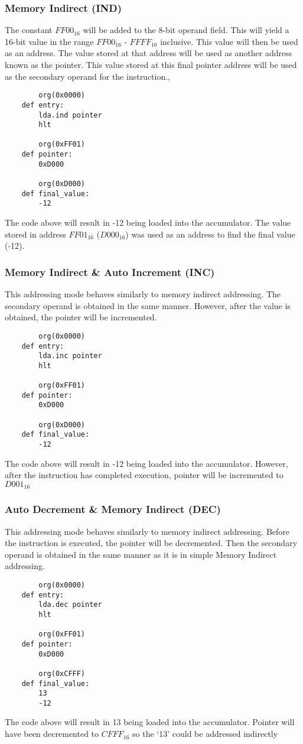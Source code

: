 \subsubsection{Memory Indirect (IND)}
The constant $FF00_{16}$ will be added to the 8-bit operand field.
This will yield a 16-bit value in the range $FF00_{16}$ - $FFFF_{16}$ inclusive.
This value will then be used as an address.
The value stored at that address will be used as another address known as the pointer.
This value stored at this final pointer address will be used as the secondary operand for the instruction.,
\begin{verbatim}
        org(0x0000)
    def entry:
        lda.ind pointer
        hlt

        org(0xFF01)
    def pointer:
        0xD000

        org(0xD000)
    def final_value:
        -12
\end{verbatim}
The code above will result in -12 being loaded into the accumulator.
The value stored in address $FF01_{16}$ ($D000_{16}$) was used as an address to find the final value (-12).

\subsubsection{Memory Indirect \& Auto Increment (INC)}
This addressing mode behaves similarly to memory indirect addressing.
The secondary operand is obtained in the same manner.
However, after the value is obtained, the pointer will be incremented.
\begin{verbatim}
        org(0x0000)
    def entry:
        lda.inc pointer
        hlt

        org(0xFF01)
    def pointer:
        0xD000

        org(0xD000)
    def final_value:
        -12
\end{verbatim}
The code above will result in -12 being loaded into the accumulator.
However, after the instruction has completed execution, pointer will be incremented to $D001_{16}$

\subsubsection{Auto Decrement \& Memory Indirect (DEC)}
This addressing mode behaves similarly to memory indirect addressing.
Before the instruction is executed, the pointer will be decremented.
Then the secondary operand is obtained in the same manner as it is in simple Memory Indirect addressing.
\begin{verbatim}
        org(0x0000)
    def entry:
        lda.dec pointer
        hlt

        org(0xFF01)
    def pointer:
        0xD000

        org(0xCFFF)
    def final_value:
        13
        -12
\end{verbatim}
The code above will result in 13 being loaded into the accumulator.
Pointer will have been decremented to $CFFF_{16}$ so the `13' could be addressed indirectly